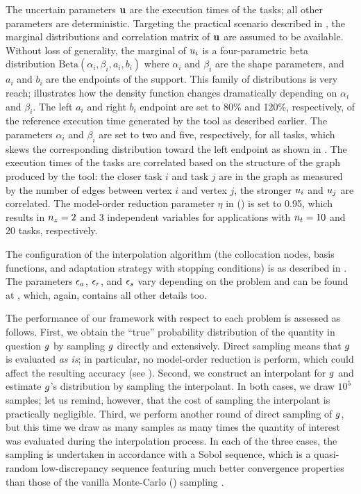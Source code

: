 
The uncertain parameters $\mathbf{u}$ are the execution times of the tasks; all other
parameters are deterministic. Targeting the practical scenario described in
, the marginal distributions and correlation matrix of $\mathbf{u}$
are assumed to be available. Without loss of generality, the marginal of $u_i$
is a four-parametric beta distribution $\text{Beta}(\alpha_i, \beta_i, a_i,
b_i)$ where $\alpha_i$ and $\beta_i$ are the shape parameters, and $a_i$ and
$b_i$ are the endpoints of the support. This family of distributions is very
reach;  illustrates how the density function changes
dramatically depending on $\alpha_i$ and $\beta_i$. The left $a_i$ and right
$b_i$ endpoint are set to 80\% and 120\%, respectively, of the reference
execution time generated by the  tool as described earlier. The
parameters $\alpha_i$ and $\beta_i$ are set to two and five, respectively, for
all tasks, which skews the corresponding distribution toward the left endpoint
as shown in . The execution times of the tasks are correlated
based on the structure of the graph produced by the  tool: the closer
task $i$ and task $j$ are in the graph as measured by the number of edges
between vertex $i$ and vertex $j$, the stronger $u_i$ and $u_j$ are
correlated. The model-order reduction parameter $\eta$ in 
() is set to 0.95, which results in ${n_z} = 2$ and 3 independent
variables for applications with ${n_t} = 10$ and 20 tasks, respectively.

The configuration of the interpolation algorithm (the collocation nodes, basis
functions, and adaptation strategy with stopping conditions) is as described in
. The parameters $\epsilon_a$, $\epsilon_r$, and $\epsilon_s$ vary
depending on the problem and can be found at \cite{sources}, which, again,
contains all other details too.

The performance of our framework with respect to each problem is assessed as
follows. First, we obtain the ``true'' probability distribution of the quantity
in question $g$ by sampling $g$ directly and extensively. Direct sampling
means that $g$ is evaluated \emph{as is}; in particular, no model-order
reduction is perform, which could affect the resulting accuracy (see
). Second, we construct an interpolant for $g$ and estimate
$g$'s distribution by sampling the interpolant. In both cases, we draw $10^5$
samples; let us remind, however, that the cost of sampling the interpolant is
practically negligible. Third, we perform another round of direct sampling of
$g$, but this time we draw as many samples as many times the quantity of
interest was evaluated during the interpolation process. In each of the three
cases, the sampling is undertaken in accordance with a Sobol sequence, which is
a quasi-random low-discrepancy sequence featuring much better convergence
properties than those of the vanilla Monte-Carlo () sampling
\cite{joe2008}.


